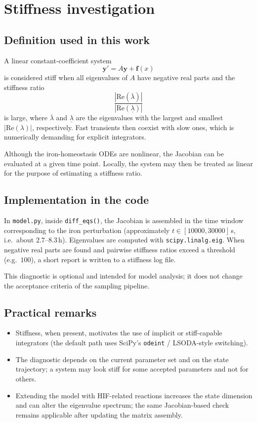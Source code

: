 \chapter{Stiffness investigation}
\label{chap:stiffness}

\section{Definition used in this work}
A linear constant-coefficient system
\[
\mathbf{y}' = A\mathbf{y} + \mathbf{f}(x)
\]
is considered stiff when all eigenvalues of $A$ have negative real parts and the
stiffness ratio
\[
\frac{|\mathrm{Re}(\overline{\lambda})|}{|\mathrm{Re}(\underline{\lambda})|}
\]
is large, where $\overline{\lambda}$ and $\underline{\lambda}$ are the
eigenvalues with the largest and smallest $|\mathrm{Re}(\lambda)|$,
respectively. Fast transients then coexist with slow ones, which is numerically
demanding for explicit integrators.

Although the iron-homeostasis ODEs are nonlinear, the Jacobian can be evaluated
at a given time point. Locally, the system may then be treated as linear for the
purpose of estimating a stiffness ratio.

\section{Implementation in the code}
In \texttt{model.py}, inside \texttt{diff\_eqs()}, the Jacobian is assembled in
the time window corresponding to the iron perturbation
(approximately $t\in[10000,30000]$\,s, i.e.\ about $2.7$--$8.3$\,h). Eigenvalues
are computed with \texttt{scipy.linalg.eig}. When negative real parts are found
and pairwise stiffness ratios exceed a threshold (e.g.\ $100$), a short report
is written to a stiffness log file.

This diagnostic is optional and intended for model analysis; it does not change
the acceptance criteria of the sampling pipeline.

\section{Practical remarks}
\begin{itemize}
  \item Stiffness, when present, motivates the use of implicit or
  stiff-capable integrators (the default path uses SciPy's \texttt{odeint} /
  LSODA-style switching).
  \item The diagnostic depends on the current parameter set and on the state
  trajectory; a system may look stiff for some accepted parameters and not for
  others.
  \item Extending the model with HIF-related reactions increases the state
  dimension and can alter the eigenvalue spectrum; the same Jacobian-based check
  remains applicable after updating the matrix assembly.
\end{itemize}
